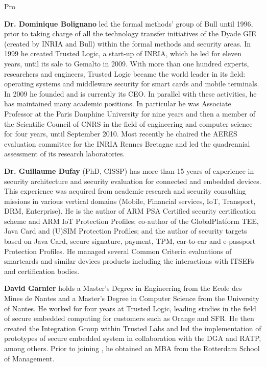 \begin{sitedescription}{Pro}
\begin{compactitem} %

\item {\bf Dr. Dominique Bolignano} led the formal methods'
  group of Bull until 1996, prior to taking charge of all the
  technology transfer initiatives of the Dyade GIE (created by INRIA
  and Bull) within the formal methods and security areas. In 1999 he
  created Trusted Logic, a start-up of INRIA, which he led for eleven
  years, until its sale to Gemalto in 2009. With more than one hundred
  experts, researchers and engineers, Trusted Logic became the world
  leader in its field: operating systems and middleware security for
  smart cards and mobile terminals. In 2009 he founded \provenrun{} and
  is currently its CEO. In parallel with these activities, he has
  maintained many academic positions. In particular he was Associate
  Professor at the Paris Dauphine University for nine years and then a
  member of the Scientific Council of CNRS in the field of engineering
  and computer science for four years, until September 2010. Most
  recently he chaired the AERES evaluation committee for the INRIA
  Rennes Bretagne and led the quadrennial assessment of its research
  laboratories.

\item {\bf Dr. Guillaume Dufay} (PhD, CISSP) has more than 15 years of
  experience in security architecture and security evaluation for
  connected and embedded devices. This experience was acquired from
  academic research and security consulting missions in various
  vertical domains (Mobile, Financial services, IoT, Transport, DRM,
  Enterprise). He is the author of ARM PSA Certified security
  certification scheme and ARM IoT Protection Profiles; co-author of
  the GlobalPlatform TEE, Java Card and (U)SIM Protection Profiles;
  and the author of security targets based on Java Card, secure
  signature, payment, TPM, car-to-car and e-passport Protection
  Profiles. He managed several Common Criteria evaluations of
  smartcards and similar devices products including the interactions
  with ITSEFs and certification bodies.

\item {\bf David Garnier} holds a Master's Degree in Engineering from
  the Ecole des Mines de Nantes and a Master's Degree in Computer
  Science from the University of Nantes. He worked for four years at
  Trusted Logic, leading studies in the field of secure embedded
  computing for customers such as Orange and SFR. He then created the
  Integration Group within Trusted Labs and led the implementation of
  prototypes of secure embedded system in collaboration with the DGA
  and RATP, among others. Prior to joining \provenrun{}, he obtained an
  MBA from the Rotterdam School of Management.


\end{compactitem}
\end{sitedescription}

